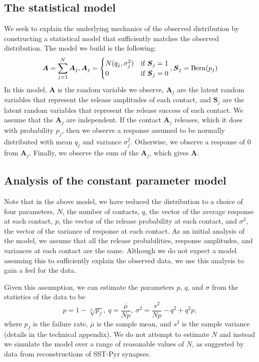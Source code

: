 \documentclass{article}
\newcommand{\rv}[1] {
\text{$\bm{#1}$}
}
\DeclareMathOperator{\bern}{Bern}
\begin{document}
\subsection{The statistical model}
We seek to explain the underlying mechanics of the observed distribution by constructing a statistical model that sufficiently matches the observed distribution. The model we build is the following:
\[
  \rv{A} = \sum_{j=1}^N \rv{A}_j, \rv{A}_j = \begin{cases}
    N(q_j,\sigma_j^2) & \text{if $\rv{S}_j = 1$} \\
    0 & \text{if $\rv{S}_j = 0$}
  \end{cases}, \rv{S}_j = \bern(p_j)
\]
In this model, $\rv{A}$ is the random variable we observe, $\rv{A}_j$ are the latent random variables that represent the release amplitudes of each contact, and $\rv{S}_j$ are the latent random variables that represent the release success of each contact. We assume that the $\rv{A}_j$ are independent. If the contact $\rv{A}_j$ releases, which it does with probability $p_j$, then we observe a response assumed to be normally distributed with mean $q_j$ and variance $\sigma_j^2$. Otherwise, we observe a response of $0$ from $\rv{A}_j$. Finally, we observe the sum of the $\rv{A}_j$, which gives $\rv{A}$.

\subsection{Analysis of the constant parameter model}
Note that in the above model, we have reduced the distribution to a choice of four parameters, $N$, the number of contacts, $q$, the vector of the average response at each contact, $p$, the vector of the release probability at each contact, and $\sigma^2$, the vector of the variance of response at each contact. As an initial analysis of the model, we assume that all the release probabilities, response amplitudes, and variances at each contact are the same. Although we do not expect a model assuming this to sufficiently explain the observed data, we use this analysis to gain a feel for the data.

Given this assumption, we can estimate the parameters $p$, $q$, and $\sigma$ from the statistics of the data to be
\[
  p = 1 - \sqrt[N]{p_f},\ q = \frac{\overline{\mu}}{Np},\ \sigma^2 = \frac{s^2}{Np} - q^2 + q^2p,
\]
where $p_f$ is the failure rate, $\overline{\mu}$ is the sample mean, and $s^2$ is the sample variance (details in the technical appendix). We do not attempt to estimate $N$ and instead we simulate the model over a range of reasonable values of $N$, as suggested by data from reconstructions of SST-Pyr synapses.
\end{document}
